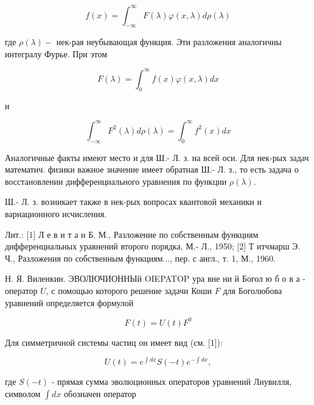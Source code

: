 \documentclass[10pt]{article}
\begin{document}
\[

f(x)=\int_{-\infty}^{\infty} F(\lambda) \varphi(x, \lambda) d \rho(\lambda)

\]



где $\rho(\lambda)-$ нек-рая неубывающая функция. Эти разложения аналогичны интегралу Фурье. При этом



\[

F(\lambda)=\int_{0}^{\infty} f(x) \varphi(x, \lambda) d x

\]



и



\[

\int_{-\infty}^{\infty} F^{2}(\lambda) d \rho(\lambda)=\int_{0}^{\infty} f^{2}(x) d x

\]



Аналогичные факты имеют место и для Ш.- Л. з. на всей оси. Для нек-рых задач математич. физики важное значение имеет обратная Ш.- Л. з., то есть задача о восстановлении дифференциального уравнения по функции $\rho(\lambda)$.



Ш.- Л. з. возникает также в нек-рых вопросах квантовой механики и вариационного исчисления.



Лит.: [1] Л е в и т а н Б. М., Разложение по собственным функциям дифференциальных уравнений второго порядка, М.- Л., 1950; [2] Т итчмарш Э. Ч., Разложения по собственным функциям..., пер. с англ., т. 1, М., 1960.



Н. Я. Виленкин. ЭВОЛЮЧИОННЫй OIEPATOP ура вне ни й Богол ю б о в а - оператор $U$, с помощью которого решение задачи Коши $F$ для Боголюбова уравнений определяется формулой



\[

F(t)=U(t) F^{0}

\]



Для симметричной системы частиц он имеет вид (см. [1]):



\[

U(t)=e^{\int d x} S(-t) e^{-\int d x},

\]



где $S(-t)$ - прямая сумма эволюционных операторов уравнений Лиувилля, символом $\int d x$ обозначен оператор
\end{document}
